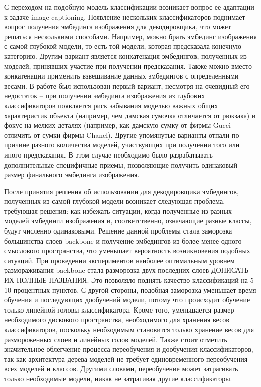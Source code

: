 \documentclass[a4paper,12pt]{extarticle}
\begin{document}
С переходом на подобную модель классификации возникает вопрос ее адаптации к задаче image captioning. Появление нескольких классификаторов поднимает вопрос получения эмбединга изображения для декодировщика, что может решаться несколькими способами. Например, можно брать эмбединг изображения с самой глубокой модели, то есть той модели, которая предсказала конечную категорию. Другим вариант является конкатенация эмбедингов, полученных из моделей, принявших участие при получении предсказания. Также можно вместо конкатенации применить взвешивание данных эмбедингов с определенными весами. В работе был использован первый вариант, несмотря на очевидный его недостаток – при получении эмбединга изображения из глубоких классификаторов появляется риск забывания моделью важных общих характеристик объекта (например, чем дамская сумочка отличается от рюкзака) и фокус на мелких деталях (например, как дамскую сумку от фирмы Gucci отличить от сумки фирмы Chanel). Другие упомянутые варианты отпали по причине разного количества моделей, участвующих при получении того или иного предсказания. В этом случае необходимо было разрабатывать дополнительные специфичные приемы, позволяющие получить одинаковый размер финального эмбединга изображения.

После принятия решения об использовании для декодировщика эмбедингов, полученных из самой глубокой модели возникает следующая проблема, требующая решения: как избежать ситуации, когда полученные из разных моделей эмбединги изображения и, соответственно, означающие разные классы, будут численно одинаковыми. Решение данной проблемы стала заморозка большинства слоев backbone и получение эмбедингов из более-менее одного смыслового пространства, что уменьшает вероятность возникновения подобных ситуаций. При проведении экспериментов наиболее оптимальным уровнем размораживания backbone стала разморозка двух последних слоев ДОПИСАТЬ ИХ ПОЛНЫЕ НАЗВАНИЯ. Это позволяло поднять качество классификаций на 5-10 процентных пунктов. С другой стороны, подобная заморозка уменьшает время обучения и последующих дообучений модели, потому что происходит обучение только линейной головы классификатора. Кроме того, уменьшается размер необходимого дискового пространства, необходимого для хранения весов классификаторов, поскольку необходимым становится только хранение весов для размороженных слоев и линейных голов моделей. Также стоит отметить значительное облегчение процесса переобучения и дообучения классификаторов, так как архитектура дерева моделей не требует единовременного переобучения всех моделей и классов. Другими словами, переобучение может затрагивать только необходимые модели, никак не затрагивая другие классификаторы.
\end{document}
